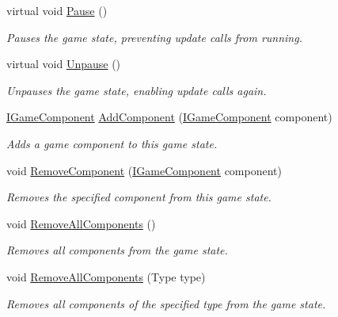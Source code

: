 \begin{DoxyCompactItemize}
virtual void \hyperlink{class_tri_devs_1_1_tri_engine2_d_1_1_state_management_1_1_game_state_a9bc6b5223a440c2f5d3207de7966231d}{Pause} ()
\begin{DoxyCompactList}\small\item\em Pauses the game state, preventing update calls from running. \end{DoxyCompactList}\item 
virtual void \hyperlink{class_tri_devs_1_1_tri_engine2_d_1_1_state_management_1_1_game_state_ad6f7c81f1bcbcfc3567be8a8018e6069}{Unpause} ()
\begin{DoxyCompactList}\small\item\em Unpauses the game state, enabling update calls again. \end{DoxyCompactList}\item 
\hyperlink{interface_tri_devs_1_1_tri_engine2_d_1_1_interfaces_1_1_i_game_component}{I\-Game\-Component} \hyperlink{class_tri_devs_1_1_tri_engine2_d_1_1_state_management_1_1_game_state_a49b2f8ff22d23c05ac8a9743e784db75}{Add\-Component} (\hyperlink{interface_tri_devs_1_1_tri_engine2_d_1_1_interfaces_1_1_i_game_component}{I\-Game\-Component} component)
\begin{DoxyCompactList}\small\item\em Adds a game component to this game state. \end{DoxyCompactList}\item 
void \hyperlink{class_tri_devs_1_1_tri_engine2_d_1_1_state_management_1_1_game_state_ae604dd5e2634397ee9b017e6ff5f1091}{Remove\-Component} (\hyperlink{interface_tri_devs_1_1_tri_engine2_d_1_1_interfaces_1_1_i_game_component}{I\-Game\-Component} component)
\begin{DoxyCompactList}\small\item\em Removes the specified component from this game state. \end{DoxyCompactList}\item 
void \hyperlink{class_tri_devs_1_1_tri_engine2_d_1_1_state_management_1_1_game_state_a3698c121ebec73ddb039a98bd7a3899b}{Remove\-All\-Components} ()
\begin{DoxyCompactList}\small\item\em Removes all components from the game state. \end{DoxyCompactList}\item 
void \hyperlink{class_tri_devs_1_1_tri_engine2_d_1_1_state_management_1_1_game_state_a0384d192aaf3bb18cdeb96145f64fe2d}{Remove\-All\-Components} (Type type)
\begin{DoxyCompactList}\small\item\em Removes all components of the specified type from the game state. \end{DoxyCompactList}\item 

\end{DoxyCompactItemize}
